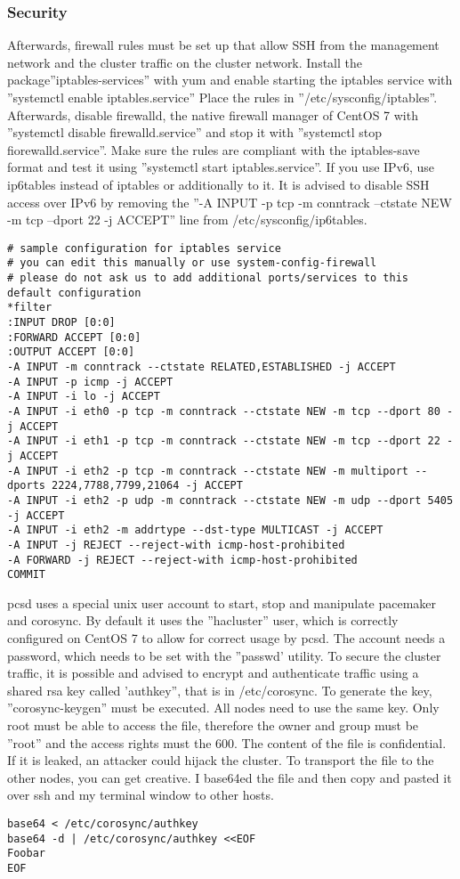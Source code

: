 \subsubsection{Security}
Afterwards, firewall rules must be set up that allow SSH from the management network
and the cluster traffic on the cluster network. Install the package''iptables-services'' with
yum and enable starting the iptables service with ''systemctl enable iptables.service''
Place the rules in ''/etc/sysconfig/iptables''. 
Afterwards, disable firewalld, the native firewall manager of CentOS 7 with ''systemctl disable firewalld.service''
and stop it with ''systemctl stop fiorewalld.service''.
Make sure the rules are compliant with the iptables-save format and test it using 
''systemctl start iptables.service''. 
If you use IPv6, use ip6tables instead of iptables or additionally to it. It is advised to disable SSH access over IPv6
by removing the ''-A INPUT -p tcp -m conntrack --ctstate NEW -m tcp --dport 22 -j ACCEPT'' line from /etc/sysconfig/ip6tables.
\begin{lstlisting}
# sample configuration for iptables service
# you can edit this manually or use system-config-firewall
# please do not ask us to add additional ports/services to this default configuration
*filter
:INPUT DROP [0:0]
:FORWARD ACCEPT [0:0]
:OUTPUT ACCEPT [0:0]
-A INPUT -m conntrack --ctstate RELATED,ESTABLISHED -j ACCEPT
-A INPUT -p icmp -j ACCEPT
-A INPUT -i lo -j ACCEPT
-A INPUT -i eth0 -p tcp -m conntrack --ctstate NEW -m tcp --dport 80 -j ACCEPT
-A INPUT -i eth1 -p tcp -m conntrack --ctstate NEW -m tcp --dport 22 -j ACCEPT
-A INPUT -i eth2 -p tcp -m conntrack --ctstate NEW -m multiport --dports 2224,7788,7799,21064 -j ACCEPT
-A INPUT -i eth2 -p udp -m conntrack --ctstate NEW -m udp --dport 5405 -j ACCEPT
-A INPUT -i eth2 -m addrtype --dst-type MULTICAST -j ACCEPT
-A INPUT -j REJECT --reject-with icmp-host-prohibited
-A FORWARD -j REJECT --reject-with icmp-host-prohibited
COMMIT
\end{lstlisting}
pcsd uses a special unix user account to start, stop and manipulate pacemaker
and corosync. By default it uses the ''hacluster'' user, which is correctly
configured on CentOS 7 to allow for correct usage by pcsd.
The account needs a password, which needs to be set with the ''passwd' utility.
To secure the cluster traffic, it is possible and advised to encrypt and authenticate
traffic using a shared rsa key called 'authkey'', that is in /etc/corosync.
To generate the key, ''corosync-keygen'' must be executed. All nodes need to use the same key.
Only root must be able to access the file, therefore the owner and group must be ''root''
and the access rights must the 600. The content of the file is confidential. If it is leaked,
an attacker could hijack the cluster. To transport the file to the other nodes, you
can get creative. I base64ed the file and then copy and pasted it over ssh and my
terminal window to other hosts.
\begin{lstlisting}
base64 < /etc/corosync/authkey
base64 -d | /etc/corosync/authkey <<EOF 
Foobar
EOF
\end{lstlisting}
